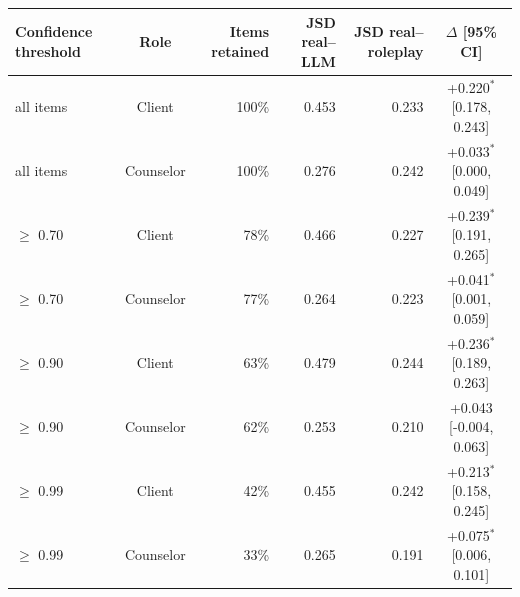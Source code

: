 \begin{tabular}{lcrrrc}
\toprule
Confidence threshold & Role & Items retained & JSD real--LLM & JSD real--roleplay & $\Delta$ [95\% CI] \\
\midrule
all items & Client & 100\% & 0.453 & 0.233 & +0.220$^{*}$ [0.178, 0.243] \\
all items & Counselor & 100\% & 0.276 & 0.242 & +0.033$^{*}$ [0.000, 0.049] \\
$\geq$ 0.70 & Client & 78\% & 0.466 & 0.227 & +0.239$^{*}$ [0.191, 0.265] \\
$\geq$ 0.70 & Counselor & 77\% & 0.264 & 0.223 & +0.041$^{*}$ [0.001, 0.059] \\
$\geq$ 0.90 & Client & 63\% & 0.479 & 0.244 & +0.236$^{*}$ [0.189, 0.263] \\
$\geq$ 0.90 & Counselor & 62\% & 0.253 & 0.210 & +0.043 [-0.004, 0.063] \\
$\geq$ 0.99 & Client & 42\% & 0.455 & 0.242 & +0.213$^{*}$ [0.158, 0.245] \\
$\geq$ 0.99 & Counselor & 33\% & 0.265 & 0.191 & +0.075$^{*}$ [0.006, 0.101] \\
\bottomrule
\end{tabular}
